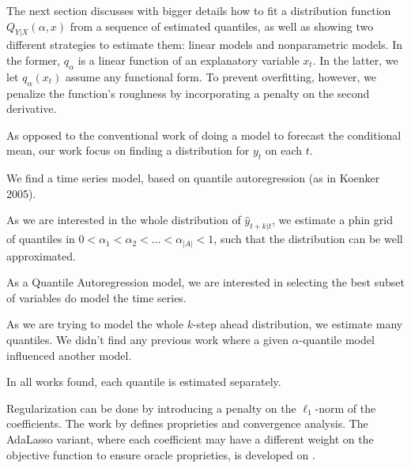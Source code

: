 The next section discusses with bigger details how to fit a distribution function $Q_{Y|X}(\alpha,x)$ from a sequence of estimated quantiles, as well as showing two different strategies to estimate them: linear models and nonparametric models. In the former, $q_\alpha$ is a linear function of an explanatory variable $x_t$.
In the latter, we let $q_\alpha(x_t)$ assume any functional form. To prevent overfitting, however, we penalize the function's roughness by incorporating a penalty on the second derivative.



As opposed to the conventional work of doing a model to forecast the
conditional mean, our work focus on finding a distribution for $y_{t}$
on each $t$. 

We find a time series model, based on quantile autoregression (as
in Koenker 2005).

As we are interested in the whole distribution of $\hat{y}_{t+k|t}$,
we estimate a phin grid of quantiles in $0<\alpha_{1}<\alpha_{2}<\dots<\alpha_{|A|}<1$,
such that the distribution can be well approximated.

As a Quantile Autoregression model, we are interested in selecting
the best subset of variables do model the time series. 

As we are trying to model the whole $k$-step ahead distribution,
we estimate many quantiles. We didn't find any previous work where
a given $\alpha$-quantile model influenced another model.

In all works found, each quantile is estimated separately. 

Regularization can be done by introducing a penalty on the $\ell_1$-norm of the coefficients. The work by \cite{belloni_l1-penalized_2009} defines proprieties and convergence analysis. The AdaLasso variant, where each coefficient may have a different weight on the objective function to ensure oracle proprieties, is developed on \cite{ciuperca_adaptive_2016}.